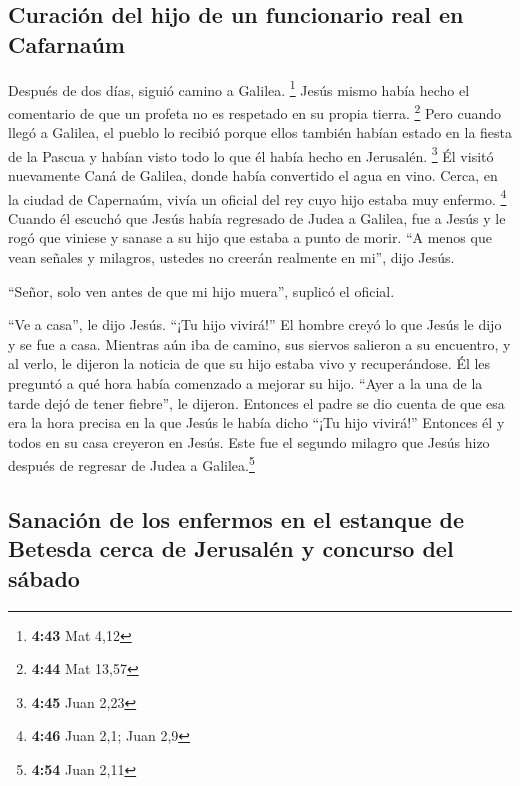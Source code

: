 \hypertarget{curaciuxf3n-del-hijo-de-un-funcionario-real-en-cafarnauxfam}{%
\subsection{Curación del hijo de un funcionario real en
Cafarnaúm}\label{curaciuxf3n-del-hijo-de-un-funcionario-real-en-cafarnauxfam}}

 Después de dos días, siguió camino a Galilea.
\footnote{\textbf{4:43} Mat 4,12}  Jesús mismo había
hecho el comentario de que un profeta no es respetado en su propia
tierra. \footnote{\textbf{4:44} Mat 13,57}  Pero cuando
llegó a Galilea, el pueblo lo recibió porque ellos también habían estado
en la fiesta de la Pascua y habían visto todo lo que él había hecho en
Jerusalén. \footnote{\textbf{4:45} Juan 2,23}  Él visitó
nuevamente Caná de Galilea, donde había convertido el agua en vino.
Cerca, en la ciudad de Capernaúm, vivía un oficial del rey cuyo hijo
estaba muy enfermo. \footnote{\textbf{4:46} Juan 2,1; Juan 2,9}
 Cuando él escuchó que Jesús había regresado de Judea a
Galilea, fue a Jesús y le rogó que viniese y sanase a su hijo que estaba
a punto de morir.  ``A menos que vean señales y milagros,
ustedes no creerán realmente en mi'', dijo Jesús.

 ``Señor, solo ven antes de que mi hijo muera'', suplicó
el oficial.

 ``Ve a casa'', le dijo Jesús. ``¡Tu hijo vivirá!'' El
hombre creyó lo que Jesús le dijo y se fue a casa. 
Mientras aún iba de camino, sus siervos salieron a su encuentro, y al
verlo, le dijeron la noticia de que su hijo estaba vivo y recuperándose.
 Él les preguntó a qué hora había comenzado a mejorar su
hijo. ``Ayer a la una de la tarde dejó de tener fiebre'', le dijeron.
 Entonces el padre se dio cuenta de que esa era la hora
precisa en la que Jesús le había dicho ``¡Tu hijo vivirá!'' Entonces él
y todos en su casa creyeron en Jesús.  Este fue el
segundo milagro que Jesús hizo después de regresar de Judea a
Galilea.\footnote{\textbf{4:54} Juan 2,11}

\hypertarget{sanaciuxf3n-de-los-enfermos-en-el-estanque-de-betesda-cerca-de-jerusaluxe9n-y-concurso-del-suxe1bado}{%
\subsection{Sanación de los enfermos en el estanque de Betesda cerca de
Jerusalén y concurso del
sábado}\label{sanaciuxf3n-de-los-enfermos-en-el-estanque-de-betesda-cerca-de-jerusaluxe9n-y-concurso-del-suxe1bado}}

